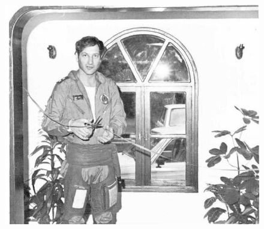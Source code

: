 \begin{figure}[h!tb] 
	\centering\includegraphics[scale=0.6]{History_Yosya/S960fPX83C8.jpg}
\end{figure}
